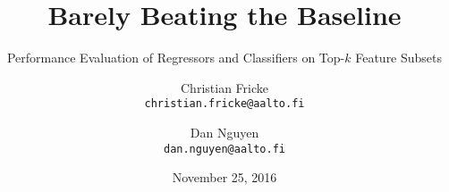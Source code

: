 
\title{Barely Beating the Baseline}
\subtitle{Performance Evaluation of Regressors and Classifiers on Top-$k$ Feature Subsets}

\author{
  \large Christian Fricke\\[-.2em]
  \texttt{\normalsize christian.fricke@aalto.fi}
  \and
  \large Dan Nguyen\\[-.2em]
  \texttt{\normalsize dan.nguyen@aalto.fi}
}

\date{\large November 25, 2016}

\maketitle

